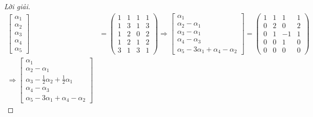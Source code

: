 \begin{proof}[Lời giải]
    \begin{align*}
        \begin{bmatrix}
            \alpha_{1} \\
            \alpha_{2} \\
            \alpha_{3} \\
            \alpha_{4} \\
            \alpha_{5}
        \end{bmatrix}                                           & =
        \begin{pmatrix}
            1 & 1 & 1 & 1 \\
            1 & 3 & 1 & 3 \\
            1 & 2 & 0 & 2 \\
            1 & 2 & 1 & 2 \\
            3 & 1 & 3 & 1
        \end{pmatrix}
        \Longrightarrow
        \begin{bmatrix}
            \alpha_{1}            \\
            \alpha_{2}-\alpha_{1} \\
            \alpha_{3}-\alpha_{1} \\
            \alpha_{4}-\alpha_{3} \\
            \alpha_{5}-3\alpha_{1}+\alpha_{4}-\alpha_{2}
        \end{bmatrix}=
        \begin{pmatrix}
            1 & 1 & 1  & 1 \\
            0 & 2 & 0  & 2 \\
            0 & 1 & -1 & 1 \\
            0 & 0 & 1  & 0 \\
            0 & 0 & 0  & 0
        \end{pmatrix}                                              \\
        \Longrightarrow
        \begin{bmatrix}
            \alpha_{1}                                             \\
            \alpha_{2}-\alpha_{1}                                  \\
            \alpha_{3}-\frac{1}{2}\alpha_{2}+\frac{1}{2}\alpha_{1} \\
            \alpha_{4} - \alpha_{3}                                \\
            \alpha_{5} - 3\alpha_{1} + \alpha_{4} - \alpha_{2}

\end{bmatrix}
\end{align*}
\end{proof}
